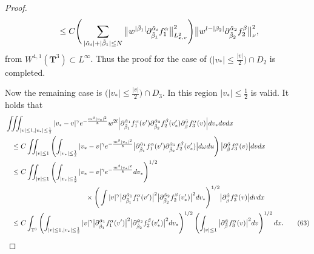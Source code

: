 \documentclass[reqno]{amsart}
\numberwithin{equation}{section}
\numberwithin{equation}{section}
\begin{document}
\begin{proof}
\begin{align*}
	&\hspace{0.4cm}\leq C \Bigg(\sum_{|\tilde{\alpha}_i| + |\tilde{\beta}_1| \le N} \big\| w^{|\tilde{\beta}_1|} \partial_{\tilde{\beta}_1}^{\tilde{\alpha}_i}f^{\alpha}_1 \big\|_{L^{2}_{x,v}}^2\Bigg) \big\| w^{l - |\beta_2|} \partial_{\tilde{\beta}_2}^{\tilde{\alpha}_2}f^{\beta}_2 \big\|_{\nu}^2,
	\end{align*}
	from $W^{4,1}(\mathbf{T}^3) \subset L^\infty$. Thus the proof for the case of $\big(|v_*| \leq \frac{|v|}{2}\big)\cap D_2$ is completed.
	
	Now the remaining case is $\big(|v_*| \leq \frac{|v|}{2}\big)\cap D_3$. In this region $|v_*| \leq \frac{1}{2}$ is valid. It holds that
	\begin{align*}
		&\iiint_{|v|\leq1,|v_*|\leq \frac{1}{2}} |v_* - v|^\gamma e^{-\frac{m^{\beta}|v_*|^2}{8}} w^{2l} \Big| \partial_{\tilde{\beta}_1}^{\tilde{\alpha}_1}f^{\alpha}_1 (v') \partial_{\tilde{\beta}_2}^{\tilde{\alpha}_2}f^{\beta}_2 (v_*') \partial_{\tilde{\beta}}^{\tilde{\alpha}}f^{\alpha}_3 (v) \Big| dv_* dv dx\\
		&\hspace{0.3cm}\leq C \iint_{|v|\leq1} \left( \int_{|v_*|\leq\frac{1}{2}} |v_* - v|^\gamma e^{-\frac{m^{\beta}|v_*|^2}{8}} \big| \partial_{\tilde{\beta}_1}^{\tilde{\alpha}_1}f^{\alpha}_1 (v') \partial_{\tilde{\beta}_2}^{\tilde{\alpha}_2}f^{\beta}_2 (v_*') \big| d\omega du \right) \big| \partial_{\tilde{\beta}}^{\tilde{\alpha}}f^{\alpha}_3 (v) \big| dvdx \\
		&\hspace{0.3cm}\leq C \iint_{|v|\leq1} \left( \int_{|v_*|\leq\frac{1}{2}} |v_* - v|^\gamma e^{-\frac{m^{\beta}|v_*|^2}{8}} dv_* \right)^{1/2} \\
		&\hspace{3.7cm}\quad \times \Bigg( \int |v|^\gamma \big| \partial_{\tilde{\beta}_1}^{\tilde{\alpha}_1}f^{\alpha}_1 (v') \big|^2 \big| \partial_{\tilde{\beta}_2}^{\tilde{\alpha}_2}f^{\beta}_2 (v_*') \big|^2 dv_* \Bigg)^{1/2} \big| \partial_{\tilde{\beta}}^{\tilde{\alpha}}f^{\alpha}_3 (v) \big| dvdx \\
		&\hspace{0.3cm}\leq C \int_{\mathbb{T}^3} \left( \int_{|v|\leq1,|v_*|\leq \frac{1}{2}} |v|^\gamma \big| \partial_{\tilde{\beta}_1}^{\tilde{\alpha}_1}f^{\alpha}_1 (v') \big|^2 \big| \partial_{\tilde{\beta}_2}^{\tilde{\alpha}_2}f^{\beta}_2 (v_*') \big|^2  dv_* \right)^{1/2}  \left( \int_{|v|\leq1} \big| \partial_{\tilde{\beta}}^{\tilde{\alpha}}f^{\alpha}_3 (v) \big|^2 dv \right)^{1/2} dx. \tag{63}

\end{align*}
\end{proof}
\end{document}
